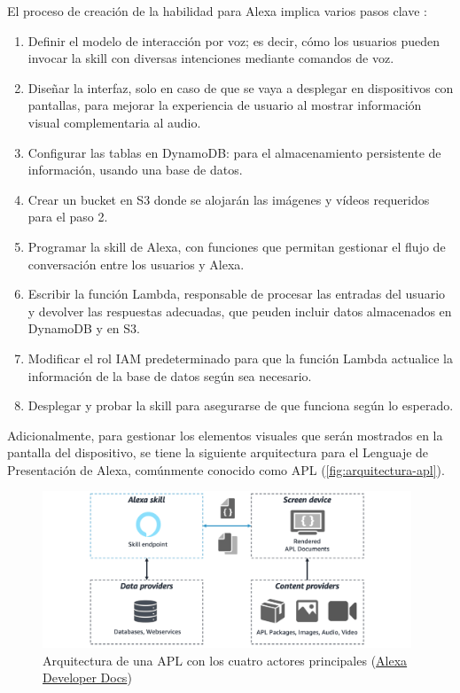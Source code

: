 \newpage

El proceso de creación de la habilidad para Alexa implica varios pasos clave \parencite{arquitecturaSkill}:
\begin{enumerate}
	\item Definir el modelo de interacción por voz; es decir, cómo los usuarios pueden invocar la skill con diversas intenciones mediante comandos de voz.
	\item Diseñar la interfaz, solo en caso de que se vaya a desplegar en dispositivos con pantallas, para mejorar la experiencia de usuario al mostrar información visual complementaria al audio.
	\item Configurar las tablas en DynamoDB: para el almacenamiento persistente de información, usando una base de datos.
	\item Crear un bucket en S3 donde se alojarán las imágenes y vídeos requeridos para el paso 2.
	\item Programar la skill de Alexa, con funciones que permitan gestionar el flujo de conversación entre los usuarios y Alexa.
	\item Escribir la función Lambda, responsable de procesar las entradas del usuario y devolver las respuestas adecuadas, que peuden incluir datos almacenados en DynamoDB y en S3.
	\item Modificar el rol IAM predeterminado para que la función Lambda actualice la información de la base de datos según sea necesario.
	\item Desplegar y probar la skill para asegurarse de que funciona según lo esperado.
\end{enumerate}

Adicionalmente, para gestionar los elementos visuales que serán mostrados en la pantalla del dispositivo, se tiene la siguiente arquitectura para el Lenguaje de Presentación de Alexa, comúnmente conocido como APL (\autoref{fig:arquitectura-apl}).

\begin{figure}[H]
	\centering
	\includegraphics[width=0.98\textwidth]{imgs/arquitectura-apl.png}
	\caption{Arquitectura de una APL con los cuatro actores principales (\href{https://developer.amazon.com/en-US/docs/alexa/alexa-presentation-language/apl-bp-understand-apl-architecture.html}{Alexa Developer Docs})}
\label{fig:arquitectura-apl}
\end{figure}

